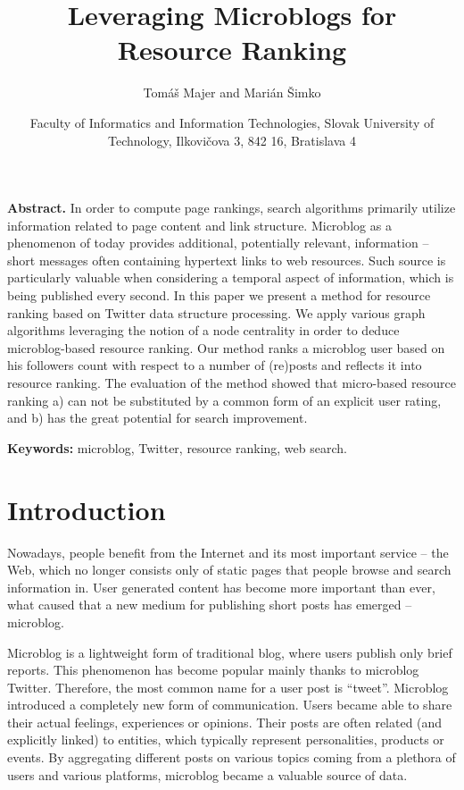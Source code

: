 \documentclass[]{article}
\begin{document}
\title {\textbf{Leveraging Microblogs for Resource Ranking}}
\author{Tomáš Majer and Marián Šimko } 
\date {\small  {{\selectfont Faculty of Informatics and Information Technologies, Slovak University of
Technology, Ilkovičova 3, 842 16, Bratislava 4}}}
\maketitle 



\begin{center} \parbox{350pt}{\textbf {Abstract.} In order to compute page rankings, search algorithms primarily
utilize information related to page content and link structure.
Microblog as a phenomenon of today provides additional, potentially
relevant, information – short messages often containing hypertext links
to web resources. Such source is particularly valuable when considering
a temporal aspect of information, which is being published every second.
In this paper we present a method for resource ranking based on Twitter
data structure processing. We apply various graph algorithms leveraging
the notion of a node centrality in order to deduce microblog-based resource
ranking. Our method ranks a microblog user based on his followers
count with respect to a number of (re)posts and reflects it into resource
ranking. The evaluation of the method showed that micro-based resource
ranking a) can not be substituted by a common form of an explicit user
rating, and b) has the great potential for search improvement.

\vspace{5mm} \textbf {Keywords:} microblog, Twitter, resource ranking, web search.
}
\end{center}
\section{Introduction}

Nowadays, people benefit from the Internet and its most important service –
the Web, which no longer consists only of static pages that people browse and
search information in. User generated content has become more important than
ever, what caused that a new medium for publishing short posts has emerged –
microblog.

Microblog is a lightweight form of traditional blog, where users publish only
brief reports. This phenomenon has become popular mainly thanks to microblog
Twitter. Therefore, the most common name for a user post is “tweet”. Microblog
introduced a completely new form of communication. Users became able to share
their actual feelings, experiences or opinions. Their posts are often related (and
explicitly linked) to entities, which typically represent personalities, products or
events. By aggregating different posts on various topics coming from a plethora
of users and various platforms, microblog became a valuable source of data.
\end{document}

